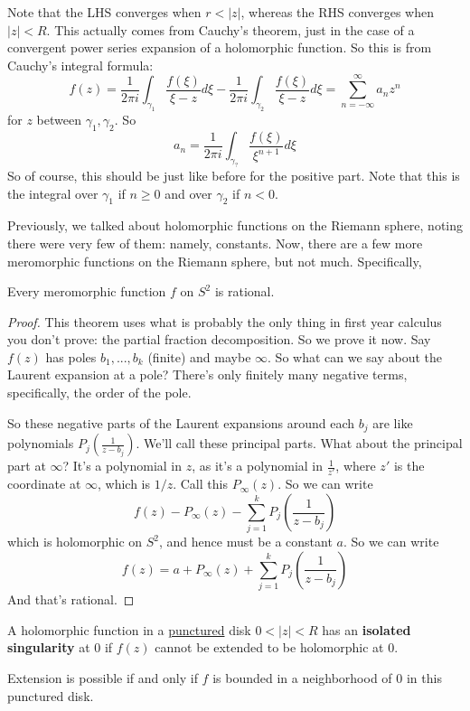 \documentclass{article}
\begin{document}
Note that the LHS converges when \(r < |z|\), whereas the RHS converges when \(|z| < R\). This actually comes from Cauchy's theorem, just in the case of a convergent power series expansion of a holomorphic function. So this is from Cauchy's integral formula:
\begin{equation}f(z) = \frac{1}{2\pi i}\int_{\gamma_1}\frac{f(\xi)}{\xi - z}d\xi - \frac{1}{2\pi i}\int_{\gamma_2}\frac{f(\xi)}{\xi - z}d\xi = \sum_{n = -\infty}^\infty a_nz^n\end{equation}
for \(z\) between \(\gamma_1, \gamma_2\).
So
\begin{equation}a_n = \frac{1}{2\pi i}\int_{\gamma_?}\frac{f(\xi)}{\xi^{n + 1}}d\xi\end{equation}
So of course, this should be just like before for the positive part. Note that this is the integral over \(\gamma_1\) if \(n \geq 0\) and over \(\gamma_2\) if \(n < 0\).

Previously, we talked about holomorphic functions on the Riemann sphere, noting there were very few of them: namely, constants. Now, there are a few more meromorphic functions on the Riemann sphere, but not much. Specifically,
\begin{theorem}
Every meromorphic function \(f\) on \(S^2\) is rational.
\end{theorem}
\begin{proof}
This theorem uses what is probably the only thing in first year calculus you don't prove: the partial fraction decomposition. So we prove it now.
Say \(f(z)\) has poles \(b_1,...,b_k\) (finite) and maybe \(\infty\). So what can we say about the Laurent expansion at a pole? There's only finitely many negative terms, specifically, the order of the pole.

So these negative parts of the Laurent expansions around each \(b_j\) are like polynomials \(P_j(\frac{1}{z - b_j})\). We'll call these principal parts. What about the principal part at \(\infty\)? It's a polynomial in \(z\), as it's a polynomial in \(\frac{1}{z'}\), where \(z'\) is the coordinate at \(\infty\), which is \(1/z\). Call this \(P_\infty(z)\). So we can write
\begin{equation}f(z) - P_\infty(z) - \sum_{j = 1}^kP_j\left(\frac{1}{z - b_j}\right)\end{equation}
which is holomorphic on \(S^2\), and hence must be a constant \(a\). So we can write
\begin{equation}f(z) = a + P_\infty(z) + \sum_{j = 1}^kP_j\left(\frac{1}{z - b_j}\right)\end{equation}
And that's rational.
\end{proof}
\begin{definition}
A holomorphic function in a \underline{punctured} disk \(0 < |z| < R\) has an \textbf{isolated singularity} at \(0\) if \(f(z)\) cannot be extended to be holomorphic at \(0\).
\end{definition}
Extension is possible if and only if \(f\) is bounded in a neighborhood of \(0\) in this punctured disk.
\end{document}
